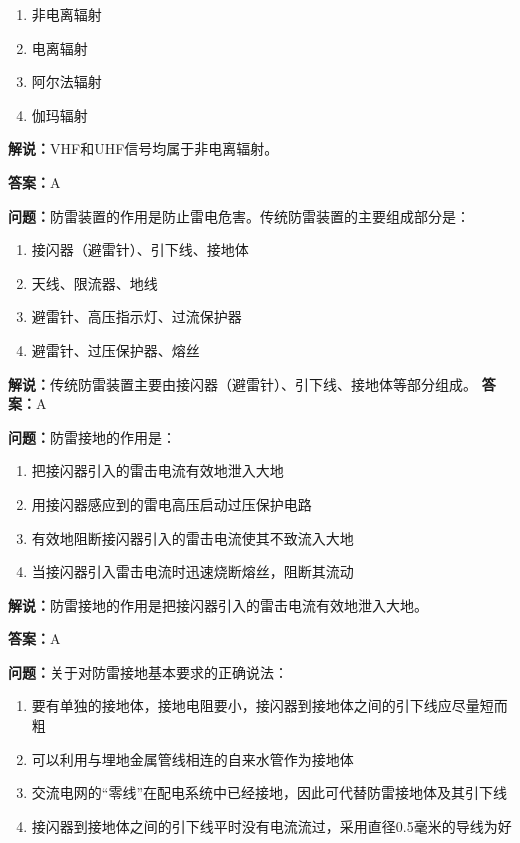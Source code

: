 \documentclass[UTF8]{ctexbook}
\begin{document}
\begin{enumerate}[label=\Alph*), leftmargin=3em]
  \item 非电离辐射
  \item 电离辐射
  \item 阿尔法辐射
  \item 伽玛辐射
\end{enumerate}

\textbf{解说：}VHF和UHF信号均属于非电离辐射。%

\textbf{答案：}A

\textbf{问题：}防雷装置的作用是防止雷电危害。传统防雷装置的主要组成部分是：

\begin{enumerate}[label=\Alph*), leftmargin=3em]
  \item 接闪器（避雷针）、引下线、接地体
  \item 天线、限流器、地线
  \item 避雷针、高压指示灯、过流保护器
  \item 避雷针、过压保护器、熔丝
\end{enumerate}

\textbf{解说：}传统防雷装置主要由接闪器（避雷针）、引下线、接地体等部分组成。%
\textbf{答案：}A

\textbf{问题：}防雷接地的作用是：

\begin{enumerate}[label=\Alph*), leftmargin=3em]
  \item 把接闪器引入的雷击电流有效地泄入大地
  \item 用接闪器感应到的雷电高压启动过压保护电路
  \item 有效地阻断接闪器引入的雷击电流使其不致流入大地
  \item 当接闪器引入雷击电流时迅速烧断熔丝，阻断其流动
\end{enumerate}

\textbf{解说：}防雷接地的作用是把接闪器引入的雷击电流有效地泄入大地。%

\textbf{答案：}A

\textbf{问题：}关于对防雷接地基本要求的正确说法：

\begin{enumerate}[label=\Alph*), leftmargin=3em]
  \item 要有单独的接地体，接地电阻要小，接闪器到接地体之间的引下线应尽量短而粗
  \item 可以利用与埋地金属管线相连的自来水管作为接地体
  \item 交流电网的“零线”在配电系统中已经接地，因此可代替防雷接地体及其引下线
  \item 接闪器到接地体之间的引下线平时没有电流流过，采用直径0.5毫米的导线为好
\end{enumerate}
\end{document}
